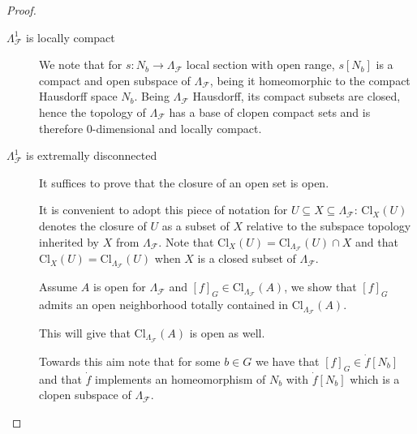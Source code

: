 \documentclass[11pt]{amsart}
\newcommand{\F}{\mathcal{F}}
\theoremstyle{plain}
\newtheorem{lemma}[theorem]{Lemma}
\theoremstyle{definition}
\theoremstyle{plain}
\theoremstyle{remark}
\DeclareMathOperator{\St}{St}
\newcommand{\bool}[1]{\mathsf{#1}}
\newcommand{\0}{\mathsf{0}}
\renewcommand{\1}{\mathsf{1}}
\renewcommand{\2}{\mathsf{2}}
\theoremstyle{definition}
\begin{document}
\begin{proof}
\begin{description}
% 
% 
%
%


\item[$\Lambda^1_\F$ is locally compact] 
We note that for $s:N_b\to\Lambda_\F$ local section with open range, $s[N_b]$ is a compact and open subspace of $\Lambda_\F$, being it homeomorphic to the compact Hausdorff space $N_b$.
Being $\Lambda_\F$ Hausdorff, its compact subsets are closed, hence the topology of $\Lambda_\F$ has a base of clopen compact sets and is therefore $0$-dimensional and locally compact. 

\item[$\Lambda^1_\F$ is extremally disconnected] It suffices to prove that the closure of an open set is open.

It is convenient to adopt this piece of notation for $U\subseteq X\subseteq\Lambda_\F$: $\mathrm{Cl}_X(U)$ denotes the closure of $U$ as a subset of $X$ relative to the subspace topology inherited by $X$ from $\Lambda_\F$. Note that $\mathrm{Cl}_X(U)=\mathrm{Cl}_{\Lambda_\F}(U)\cap X$ and that  $\mathrm{Cl}_X(U)=\mathrm{Cl}_{\Lambda_\F}(U)$ when $X$ is a closed subset of $\Lambda_\F$.

Assume $A$ is open for $\Lambda_\F$ and $[f]_G\in\mathrm{Cl}_{\Lambda_\F}(A)$, we show that $[f]_G$ admits an open neighborhood totally contained in $\mathrm{Cl}_{\Lambda_\F}(A)$. 

This will give that $\mathrm{Cl}_{\Lambda_\F}(A)$ is open as well. 

Towards this aim note that for some $b\in G$ we have that $[f]_G\in \dot{f}[N_b]$ and that $\dot{f}$ implements an homeomorphism of $N_b$ with $\dot{f}[N_b]$ which is a clopen subspace of $\Lambda_\F$.


\end{description}
\end{proof}
\end{document}
